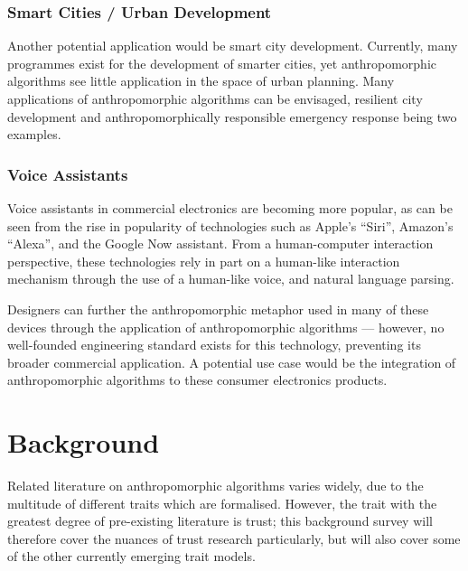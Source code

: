 \subsubsection*{Smart Cities / Urban Development}
Another potential application would be smart city development. Currently, many programmes exist for the development of smarter cities\cite{nam2011conceptualizing}, yet anthropomorphic algorithms see little application in the space of urban planning. Many applications of anthropomorphic algorithms can be envisaged\cite{wallis_x}, resilient city development and anthropomorphically responsible emergency response being two examples.\par

\subsubsection*{Voice Assistants}
Voice assistants in commercial electronics are becoming more popular, as can be seen from the rise in popularity of technologies such as Apple's ``Siri'', Amazon's ``Alexa'', and the Google Now assistant. From a human-computer interaction perspective, these technologies rely in part on a human-like interaction mechanism through the use of a human-like voice, and natural language parsing.\par

Designers can further the anthropomorphic metaphor used in many of these devices through the application of anthropomorphic algorithms --- however, no well-founded engineering standard exists for this technology, preventing its broader commercial application. A potential use case would be the integration of anthropomorphic algorithms to these consumer electronics products.\par

\section{Background}
\label{sec:background}
Related literature on anthropomorphic algorithms varies widely, due to the multitude of different traits which are formalised. However, the trait with the greatest degree of pre-existing literature is trust; this background survey will therefore cover the nuances of trust research particularly, but will also cover some of the other currently emerging trait models.\par

